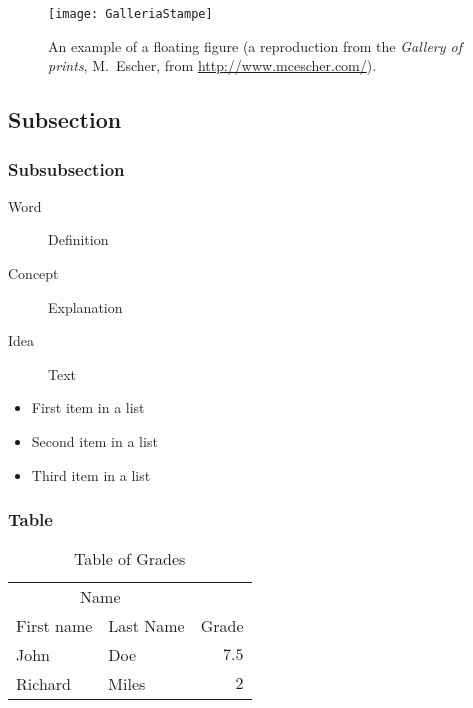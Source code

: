 \documentclass[
10pt, %
a4paper, %
oneside, %
headinclude,footinclude, %
BCOR5mm, %
]{scrartcl}
\begin{document}
\begin{figure}[tb]
\centering 
\texttt{[image: GalleriaStampe]} 
\caption[An example of a floating figure]{An example of a floating figure (a reproduction from the \emph{Gallery of prints}, M.~Escher, from \url{http://www.mcescher.com/}).} %
\label{fig:gallery} 
\end{figure}

\lipsum[10] %


\subsection{Subsection}

\lipsum[11] %

\subsubsection{Subsubsection}

\lipsum[12] %

\begin{description}
\item[Word] Definition
\item[Concept] Explanation
\item[Idea] Text
\end{description}

\lipsum[12] %

\begin{itemize}[noitemsep] %
\item First item in a list
\item Second item in a list
\item Third item in a list
\end{itemize}

\subsubsection{Table}

\lipsum[13] %

\begin{table}[hbt]
\caption{Table of Grades}
\centering
\begin{tabular}{llr}
\toprule
\multicolumn{2}{c}{Name} \\
\cmidrule(r){1-2}
First name & Last Name & Grade \\
\midrule
John & Doe & $7.5$ \\
Richard & Miles & $2$ \\
\bottomrule
\end{tabular}
\label{tab:label}
\end{table}
\end{document}
